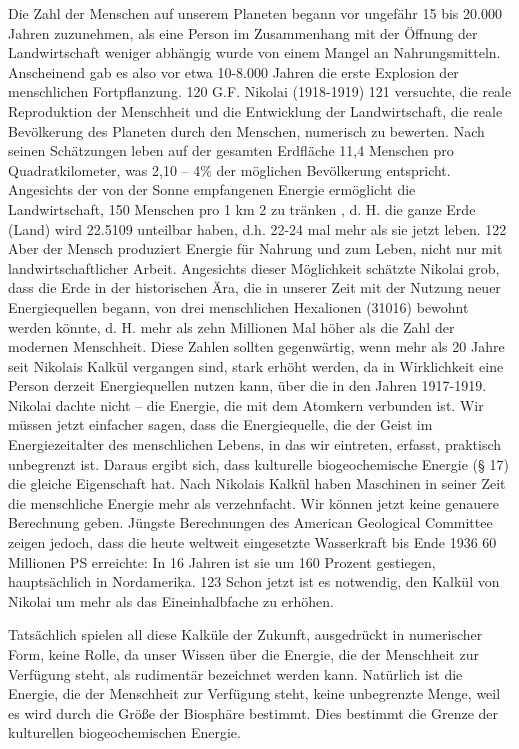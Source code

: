 \documentclass[11pt,a4paper]{book}
\begin{document}
Die Zahl der Menschen auf unserem Planeten begann vor ungefähr 15 bis 20.000 Jahren zuzunehmen, als eine Person im Zusammenhang mit der Öffnung der Landwirtschaft weniger abhängig wurde von einem Mangel an Nahrungsmitteln. Anscheinend gab es also vor etwa 10-8.000 Jahren die erste Explosion der menschlichen Fortpflanzung. 120 G.F. Nikolai (1918-1919) 121 versuchte, die reale Reproduktion der Menschheit und die Entwicklung der Landwirtschaft, die reale Bevölkerung des Planeten durch den Menschen, numerisch zu bewerten. Nach seinen Schätzungen leben auf der gesamten Erdfläche 11,4 Menschen pro Quadratkilometer, was 2,10 -- 4\% der möglichen Bevölkerung entspricht. Angesichts der von der Sonne empfangenen Energie ermöglicht die Landwirtschaft, 150 Menschen pro 1 km 2 zu tränken , d. H. die ganze Erde (Land) wird 22.5109 unteilbar haben, d.h. 22-24 mal mehr als sie jetzt leben. 122 Aber der Mensch produziert Energie für Nahrung und zum Leben, nicht nur mit landwirtschaftlicher Arbeit. Angesichts dieser Möglichkeit schätzte Nikolai grob, dass die Erde in der historischen Ära, die in unserer Zeit mit der Nutzung neuer Energiequellen begann, von drei menschlichen Hexalionen (31016) bewohnt werden könnte, d. H. mehr als zehn Millionen Mal höher als die Zahl der modernen Menschheit. Diese Zahlen sollten gegenwärtig, wenn mehr als 20 Jahre seit Nikolais Kalkül vergangen sind, stark erhöht werden, da in Wirklichkeit eine Person derzeit Energiequellen nutzen kann, über die in den Jahren 1917-1919. Nikolai dachte nicht -- die Energie, die mit dem Atomkern verbunden ist. Wir müssen jetzt einfacher sagen, dass die Energiequelle, die der Geist im Energiezeitalter des menschlichen Lebens, in das wir eintreten, erfasst, praktisch unbegrenzt ist. Daraus ergibt sich, dass kulturelle biogeochemische Energie (§ 17) die gleiche Eigenschaft hat. Nach Nikolais Kalkül haben Maschinen in seiner Zeit die menschliche Energie mehr als verzehnfacht. Wir können jetzt keine genauere Berechnung geben. Jüngste Berechnungen des American Geological Committee zeigen jedoch, dass die heute weltweit eingesetzte Wasserkraft bis Ende 1936 60 Millionen PS erreichte: In 16 Jahren ist sie um 160 Prozent gestiegen, hauptsächlich in Nordamerika. 123 Schon jetzt ist es notwendig, den Kalkül von Nikolai um mehr als das Eineinhalbfache zu erhöhen.



Tatsächlich spielen all diese Kalküle der Zukunft, ausgedrückt in numerischer Form, keine Rolle, da unser Wissen über die Energie, die der Menschheit zur Verfügung steht, als rudimentär bezeichnet werden kann. Natürlich ist die Energie, die der Menschheit zur Verfügung steht, keine unbegrenzte Menge, weil es wird durch die Größe der Biosphäre bestimmt. Dies bestimmt die Grenze der kulturellen biogeochemischen Energie.
\end{document}
